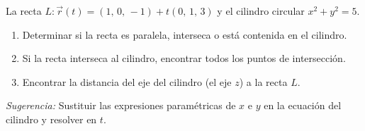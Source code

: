 La recta $L: \vec{r}(t) = (1,\, 0,\, -1) + t(0,\, 1,\, 3)$ y el cilindro circular $x^2 + y^2 = 5$.
\begin{enumerate}
    \item Determinar si la recta es paralela, interseca o está contenida en el cilindro.
    \item Si la recta interseca al cilindro, encontrar todos los puntos de intersección.
    \item Encontrar la distancia del eje del cilindro (el eje $z$) a la recta $L$.
\end{enumerate}

\textit{Sugerencia:} Sustituir las expresiones paramétricas de $x$ e $y$ en la ecuación del cilindro y resolver en $t$.